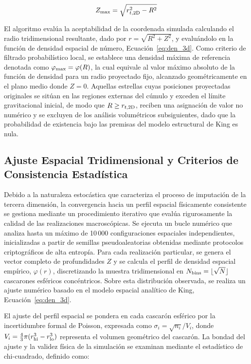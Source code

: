        $$Z_{\rm max} = \sqrt{r_{t,\rm 2D}^2 - R^2}$$
        
        El algoritmo evalúa la aceptabilidad de la coordenada simulada 
        calculando el radio tridimensional resultante, dado por 
        $r = \sqrt{R^2 + Z^2}$, y evaluándolo en la función de densidad espacial 
        de número, Ecuación~\eqref{eq:den_3d}. Como criterio de filtrado 
        probabilístico local, se establece una densidad máxima de referencia 
        denotada como $\varphi_{\rm max} = \varphi(R)$, la cual equivale al 
        valor máximo absoluto de la función de densidad para un radio proyectado 
        fijo, alcanzado geométricamente en el plano medio donde $Z=0$. Aquellas 
        estrellas cuyas posiciones proyectadas originales se sitúan en las 
        regiones externas del cúmulo y exceden el límite gravitacional inicial, 
        de modo que $R \geq r_{t,\rm 2D}$, reciben una asignación de valor no 
        numérico y se excluyen de los análisis volumétricos subsiguientes, dado 
        que la probabilidad de existencia bajo las premisas del modelo 
        estructural de King es nula.

    \subsection{
        Ajuste Espacial Tridimensional y Criterios de Consistencia Estadística
        }
        Debido a la naturaleza estocástica que caracteriza el proceso de 
        imputación de la tercera dimensión, la convergencia hacia un perfil 
        espacial físicamente consistente se gestiona mediante un procedimiento 
        iterativo que evalúa rigurosamente la calidad de las realizaciones 
        macroscópicas. Se ejecuta un bucle numérico que analiza hasta un máximo 
        de 10\,000 configuraciones espaciales independientes, inicializadas a 
        partir de semillas pseudoaleatorias obtenidas mediante protocolos 
        criptográficos de alta entropía. Para cada realización particular, se 
        genera el vector completo de profundidades $Z$ y se calcula el perfil de 
        densidad espacial empírico, $\varphi(r)$, discretizando la muestra 
        tridimensional en $N_{\rm bins} = \lfloor \sqrt{N} \rfloor$ cascarones 
        esféricos concéntricos. Sobre esta distribución observada, se realiza un 
        ajuste numérico basado en el modelo espacial analítico de King, 
        Ecuación~\eqref{eq:den_3d}.

        El ajuste del perfil espacial se pondera en cada cascarón esférico por 
        la incertidumbre formal de Poisson, expresada como 
        $\sigma_i = \sqrt{n_i}/V_i$, donde $V_i = \frac{4}{3}\pi(r_{\rm hi}^3 - 
        r_{\rm lo}^3)$ representa el volumen geométrico del cascarón. La bondad 
        del ajuste y la validez física de la simulación se examinan mediante el 
        estadístico de chi-cuadrado, definido como: 
        
